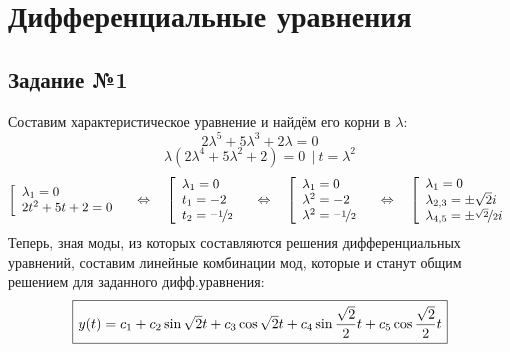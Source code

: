 \documentclass[a3paper,14pt]{extarticle}
\newcommand*\squared[1]{\tikz[baseline=(char.base)]{
            \node[shape=rectangle,draw,inner sep=4pt] (char) {$#1$};}}
\newcommand{\at}{\biggr\rvert}
\begin{document}
\section*{\centering Дифференциальные уравнения}
\subsection*{\centering Задание №1}
Составим характеристическое уравнение и найдём его корни в $\lambda$:
$$2\lambda^5 + 5\lambda^3 + 2\lambda = 0$$
$$\lambda(2\lambda^4+5\lambda^2 + 2) = 0\ \ \at\ t = \lambda^2$$
$$\left[\begin{array}{l}
    \lambda_1 = 0 \\
    2t^2+5t+2 = 0
\end{array}\right. \quad \Leftrightarrow \quad \left[\begin{array}{l}
    \lambda_1 = 0 \\
    t_1 = -2 \\
    t_2=\nicefrac{-1}{2}
\end{array}\right. \quad \Leftrightarrow \quad \left[\begin{array}{l}
    \lambda_1 = 0 \\
    \lambda^2 = -2 \\
    \lambda^2=\nicefrac{-1}{2}
\end{array}\right. \quad \Leftrightarrow \quad \left[\begin{array}{l}
    \lambda_1 = 0 \\
    \lambda_{2,3} = \pm \sqrt{2}i \\
    \lambda_{4,5}=\pm \nicefrac{\sqrt{2}}{2}i
\end{array}\right.$$
Теперь, зная моды, из которых составляются решения дифференциальных уравнений, составим линейные комбинации мод, которые и станут общим решением для заданного дифф.уравнения:
$$\squared{y(t) = c_1+c_2\sin\sqrt{2}t + c_3\cos\sqrt{2}t+c_4\sin\dfrac{\sqrt{2}}{2}t+c_5\cos\dfrac{\sqrt{2}}{2}t}$$
\end{document}
